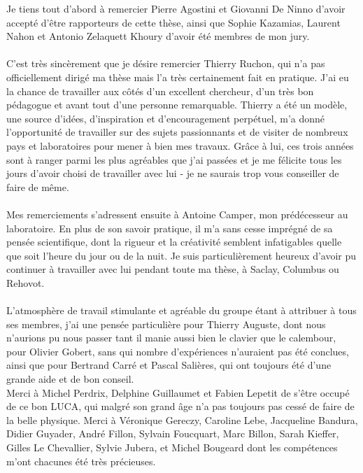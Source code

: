 
Je tiens tout d'abord à remercier Pierre Agostini et Giovanni De Ninno d'avoir accepté d'être rapporteurs de cette thèse, ainsi que Sophie Kazamias, Laurent Nahon et Antonio Zelaquett Khoury d'avoir été membres de mon jury.\\ \\
C'est très sincèrement que je désire remercier Thierry Ruchon, qui n'a pas officiellement dirigé ma thèse mais l'a très certainement fait en pratique. J'ai eu la chance de travailler aux côtés d'un excellent chercheur, d'un très bon pédagogue et avant tout d'une personne remarquable. Thierry a été un modèle, une source d'idées, d'inspiration et d'encouragement perpétuel, m'a donné l'opportunité de travailler sur des sujets passionnants et de visiter de nombreux pays et laboratoires pour mener à bien mes travaux. Grâce à lui, ces trois années sont à ranger parmi les plus agréables que j'ai passées et je me félicite tous les jours d'avoir choisi de travailler avec lui - je ne saurais trop vous conseiller de faire de même.\\ \\
Mes remerciements s'adressent ensuite à Antoine Camper, mon prédécesseur au laboratoire. En plus de son savoir pratique, il m'a sans cesse imprégné de sa pensée scientifique, dont la rigueur et la créativité semblent infatigables quelle que soit l'heure du jour ou de la nuit. Je suis particulièrement heureux d'avoir pu continuer à travailler avec lui pendant toute ma thèse, à Saclay, Columbus ou Rehovot.\\ \\
L'atmosphère de travail stimulante et agréable du groupe étant à attribuer à tous ses membres, j'ai une pensée particulière pour Thierry Auguste, dont nous n'aurions pu nous passer tant il manie aussi bien le clavier que le calembour, pour Olivier Gobert, sans qui nombre d'expériences n'auraient pas été conclues, ainsi que pour Bertrand Carré et Pascal Salières, qui ont toujours été d'une grande aide et de bon conseil. \\Merci à Michel Perdrix, Delphine Guillaumet et Fabien Lepetit de s'être occupé de ce bon LUCA, qui malgré son grand âge n'a pas toujours pas cessé de faire de la belle physique. Merci à Véronique Gereczy, Caroline Lebe, Jacqueline Bandura, Didier Guyader, André Fillon, Sylvain Foucquart, Marc Billon, Sarah Kieffer, Gilles Le Chevallier, Sylvie Jubera, et Michel Bougeard dont les compétences m'ont chacunes été très précieuses.\\
